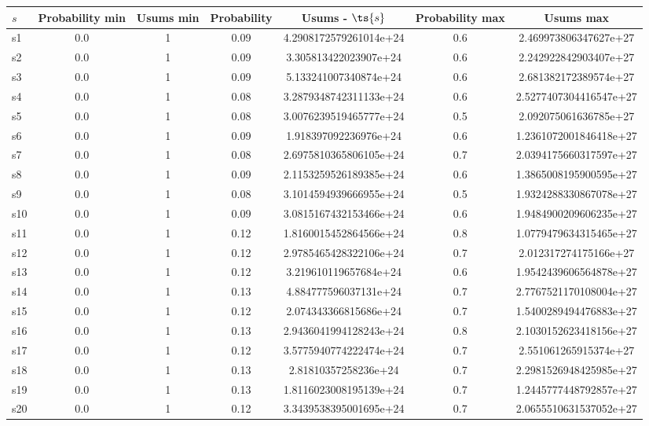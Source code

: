 \documentclass{article}
\begin{document}
\noindent\begin{tabular}{|l|c|c|c|c|c|c|}
\hline
$s$& Probability min & Usums min & Probability & Usums - $\ts{s}$ & Probability max & Usums max\\
\hline
s1 &0.0 & 1 & 0.09 & 4.2908172579261014e+24 & 0.6 & 2.469973806347627e+27\\
\hline
s2 &0.0 & 1 & 0.09 & 3.305813422023907e+24 & 0.6 & 2.242922842903407e+27\\
\hline
s3 &0.0 & 1 & 0.09 & 5.133241007340874e+24 & 0.6 & 2.681382172389574e+27\\
\hline
s4 &0.0 & 1 & 0.08 & 3.2879348742311133e+24 & 0.6 & 2.5277407304416547e+27\\
\hline
s5 &0.0 & 1 & 0.08 & 3.0076239519465777e+24 & 0.5 & 2.092075061636785e+27\\
\hline
s6 &0.0 & 1 & 0.09 & 1.918397092236976e+24 & 0.6 & 1.2361072001846418e+27\\
\hline
s7 &0.0 & 1 & 0.08 & 2.6975810365806105e+24 & 0.7 & 2.0394175660317597e+27\\
\hline
s8 &0.0 & 1 & 0.09 & 2.1153259526189385e+24 & 0.6 & 1.3865008195900595e+27\\
\hline
s9 &0.0 & 1 & 0.08 & 3.1014594939666955e+24 & 0.5 & 1.9324288330867078e+27\\
\hline
s10 &0.0 & 1 & 0.09 & 3.0815167432153466e+24 & 0.6 & 1.9484900209606235e+27\\
\hline
s11 &0.0 & 1 & 0.12 & 1.8160015452864566e+24 & 0.8 & 1.0779479634315465e+27\\
\hline
s12 &0.0 & 1 & 0.12 & 2.9785465428322106e+24 & 0.7 & 2.012317274175166e+27\\
\hline
s13 &0.0 & 1 & 0.12 & 3.219610119657684e+24 & 0.6 & 1.9542439606564878e+27\\
\hline
s14 &0.0 & 1 & 0.13 & 4.884777596037131e+24 & 0.7 & 2.7767521170108004e+27\\
\hline
s15 &0.0 & 1 & 0.12 & 2.074343366815686e+24 & 0.7 & 1.5400289494476883e+27\\
\hline
s16 &0.0 & 1 & 0.13 & 2.9436041994128243e+24 & 0.8 & 2.1030152623418156e+27\\
\hline
s17 &0.0 & 1 & 0.12 & 3.5775940774222474e+24 & 0.7 & 2.551061265915374e+27\\
\hline
s18 &0.0 & 1 & 0.13 & 2.81810357258236e+24 & 0.7 & 2.2981526948425985e+27\\
\hline
s19 &0.0 & 1 & 0.13 & 1.8116023008195139e+24 & 0.7 & 1.2445777448792857e+27\\
\hline
s20 &0.0 & 1 & 0.12 & 3.3439538395001695e+24 & 0.7 & 2.0655510631537052e+27\\

\end{tabular}
\end{document}
